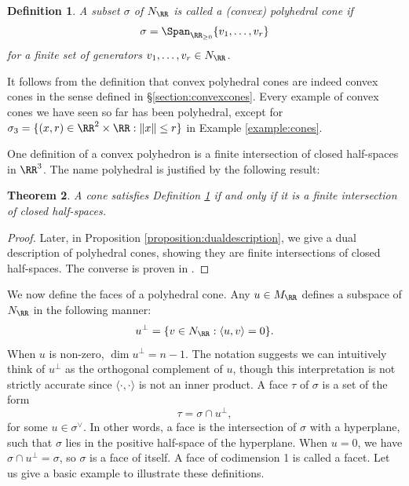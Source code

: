 \documentclass[12pt]{amsart}
\theoremstyle{plain}
\newtheorem{theorem}{Theorem}[subsection]
\newtheorem{definition}[theorem]{Definition}
\begin{document}
\begin{definition}\label{definition:convexpolyhedral}
A subset $\sigma$ of $N_\RR$ is called a (convex) polyhedral cone if
$$\sigma = \Span_{\RR_{\ge 0}} \{v_1, \ldots, v_r\}$$
for a finite set of generators $v_1, \ldots, v_r \in N_\RR$.
\end{definition}

It follows from the definition that convex polyhedral cones are indeed convex cones in the sense defined in \S \ref{section:convexcones}.
Every example of convex cones we have seen so far has been polyhedral, except for $\sigma_3 = \{(x, r) \in \RR^2 \times \RR : \|x\| \le r\}$ in Example \ref{example:cones}.

One definition of a convex polyhedron is a finite intersection of closed half-spaces in $\RR^3$.
The name polyhedral is justified by the following result:

\begin{theorem}
A cone satisfies Definition \ref{definition:convexpolyhedral} if and only if it is a finite intersection of closed half-spaces.
\end{theorem}
\begin{proof}
Later, in Proposition \ref{proposition:dualdescription}, we give a dual description of polyhedral cones, showing they are finite intersections of closed half-spaces.
The converse is proven in \cite[1.3.13]{DLHK13}.
\end{proof}

We now define the faces of a polyhedral cone.
Any $u \in M_\RR$ defines a subspace of $N_\RR$ in the following manner:
$$u^\perp = \{v \in N_\RR : \langle u, v \rangle = 0\}.$$
When $u$ is non-zero, $\dim u^\perp = n -1$.
The notation suggests we can intuitively think of $u^\perp$ as the orthogonal complement of $u$, though this interpretation is not strictly accurate since $\langle \cdot, \cdot \rangle$ is not an inner product.
A face $\tau$ of $\sigma$ is a set of the form 
$$\tau = \sigma \cap u^\perp,$$
for some $u \in \sigma^\vee$.
In other words, a face is the intersection of $\sigma$ with a hyperplane, such that $\sigma$ lies in the positive half-space of the hyperplane.
When $u = 0$, we have $\sigma \cap u^\perp = \sigma$, so $\sigma$ is a face of itself.
A face of codimension 1 is called a facet.
Let us give a basic example to illustrate these definitions.
\end{document}
